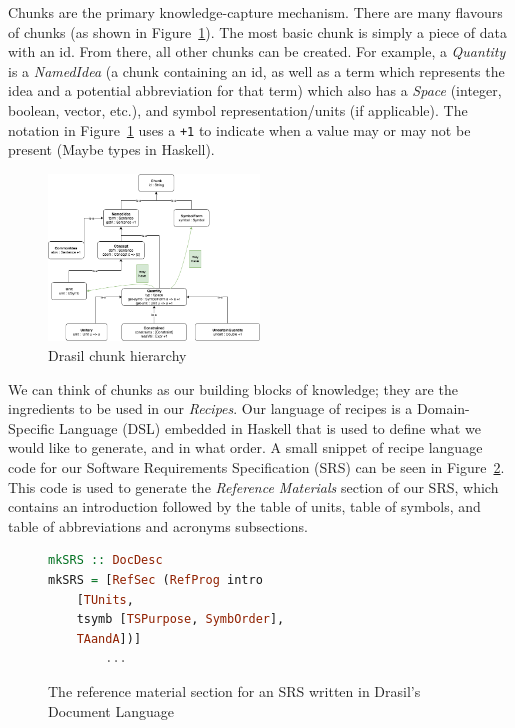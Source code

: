 \documentclass[sigconf]{acmart}
\begin{document}
Chunks are the primary knowledge-capture mechanism. There are many flavours of 
chunks (as shown in Figure~\ref{hierarchy}). The most basic chunk is simply a 
piece of data with an id. From there, all other chunks can be created. For 
example, a \textit{Quantity} is a \textit{NamedIdea} (a chunk containing an id, 
as well as a term which represents the idea and a potential abbreviation for 
that term) which also has a \textit{Space} (integer, boolean, vector, etc.), 
and symbol representation/units (if applicable).  The notation in
Figure~\ref{hierarchy} uses a \verb|+1| to indicate when a value may or
may not be present (Maybe types in Haskell).

\begin{figure}
	\centering
	\includegraphics[width=0.5\textwidth]{figures/class_hierarchy.png}
	\caption{Drasil chunk hierarchy}
	\label{hierarchy}
\end{figure}

We can think of chunks as our building blocks of knowledge; they are the 
ingredients to be used in our \textit{Recipes}. Our language of recipes is a 
Domain-Specific Language (DSL) embedded in Haskell that is used to define what 
we would like to generate, and in what order. A small snippet of recipe 
language code for our Software Requirements Specification (SRS) can be seen in 
Figure~\ref{recipeLang}. This code is used to generate the \textit{Reference 
Materials} section of our SRS, which contains an introduction followed by the 
table of units, table of symbols, and table of abbreviations and acronyms 
subsections.

\begin{figure}
\begin{lstlisting}[language=Haskell, frame=single, showstringspaces=false]
mkSRS :: DocDesc 
mkSRS = [RefSec (RefProg intro 
	[TUnits, 
	tsymb [TSPurpose, SymbOrder], 
	TAandA])]
        ...
\end{lstlisting}
\caption{The reference material section for an SRS written in Drasil's Document 
Language}
\label{recipeLang}
\end{figure}
\end{document}
